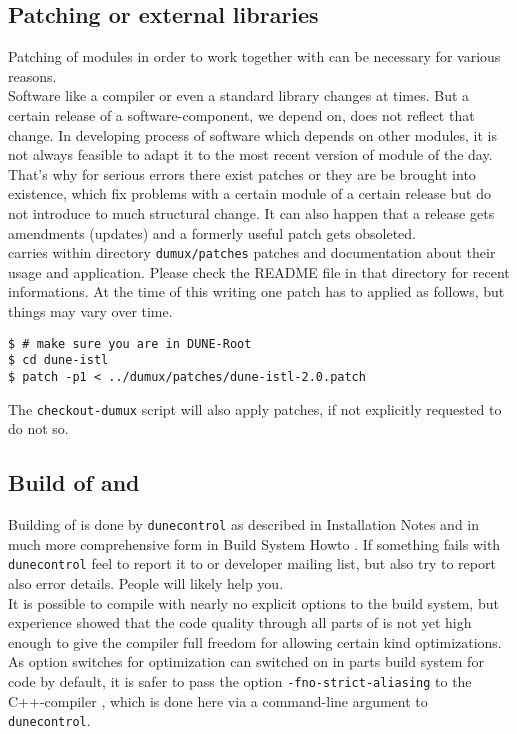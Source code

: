 \subsection{Patching \Dune or external libraries}
Patching of \Dune modules in order to work together with \Dumux
can be necessary for various reasons. \\

Software like a compiler or even a standard library
changes at times. But a certain release of a software-component, we depend on, does not reflect that change.
In developing process of software which depends on other modules, it is not always feasible 
to adapt it to the most recent version of module of the day. That's why for serious errors 
there exist patches or they are be brought into existence, which fix problems with a certain module
of a certain release but do not introduce to much structural change. It can also happen 
that a release gets amendments (updates) and a formerly useful patch gets obsoleted.\\

\Dumux carries within directory \texttt{dumux/patches} patches and documentation about their usage and application.
Please check the README file in that directory for recent informations. 
At the time of this writing one patch has to applied as follows, but things may vary over time.

\begin{lstlisting}[style=Bash]
$ # make sure you are in DUNE-Root
$ cd dune-istl
$ patch -p1 < ../dumux/patches/dune-istl-2.0.patch
\end{lstlisting}

The \texttt{checkout-dumux} script will also apply patches, if not explicitly requested to do not so.

\subsection{Build of \Dune and \Dumux}
\label{buildIt}
Building of \Dune is done by \texttt{dunecontrol} as described in \Dune Installation Notes \cite{DUNE-INST}
and in much more comprehensive form in \Dune Build System Howto \cite{DUNE-BS}.
If something fails with \texttt{dunecontrol} feel to report it to \Dune or \Dumux developer mailing list,
but also try to report also error details. People will likely help you.\\

It is possible to compile \Dumux with nearly no explicit options to the build system, but
experience showed that the code quality through all parts of \Dune is not yet high enough to give the compiler full 
freedom for allowing certain kind optimizations. As option switches for optimization can switched on in parts
build system for code by default, it is safer to pass the option \texttt{-fno-strict-aliasing} to the C++-compiler
\cite{WIKIPED-ALIASING}, which is done here via a command-line argument to \texttt{dunecontrol}.


